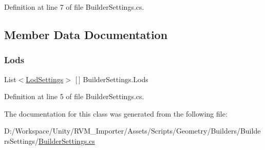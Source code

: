 Definition at line 7 of file Builder\+Settings.\+cs.



\subsection{Member Data Documentation}
\mbox{\label{class_builder_settings_a88e4ad513d7779376f9b94ec9201c49a}} 
\subsubsection{\texorpdfstring{Lods}{Lods}}
{\footnotesize\ttfamily List$<$\mbox{\hyperlink{class_lod_settings}{Lod\+Settings}}$>$ \mbox{[}$\,$\mbox{]} Builder\+Settings.\+Lods}



Definition at line 5 of file Builder\+Settings.\+cs.



The documentation for this class was generated from the following file\+:\begin{DoxyCompactItemize}
\item 
D\+:/\+Workspace/\+Unity/\+R\+V\+M\+\_\+\+Importer/\+Assets/\+Scripts/\+Geometry/\+Builders/\+Builders\+Settings/\mbox{\hyperlink{_builder_settings_8cs}{Builder\+Settings.\+cs}}\end{DoxyCompactItemize}
